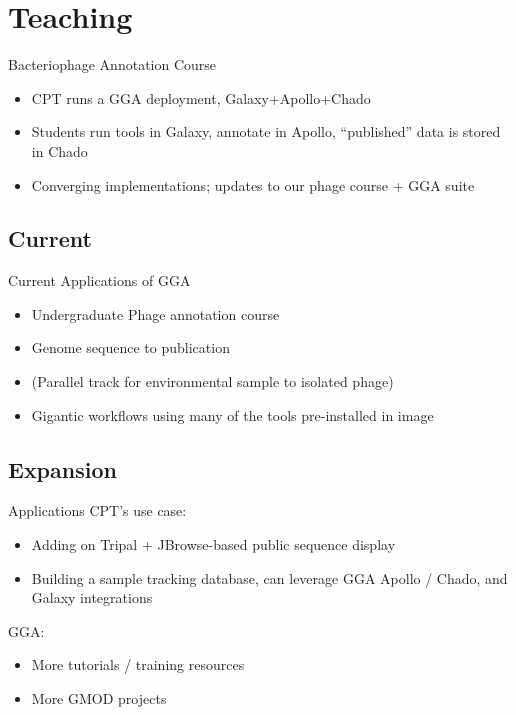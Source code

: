 \documentclass[12pt]{phage3slides} %
\begin{document}
\section{Teaching}
\begin{frame}{Bacteriophage Annotation Course}
    \begin{itemize}
        \item CPT runs a GGA deployment, Galaxy+Apollo+Chado
        \item Students run tools in Galaxy, annotate in Apollo, ``published'' data is stored in Chado
        \item Converging implementations; updates to our phage course + GGA suite
    \end{itemize}
\end{frame}

\subsection{Current}
\begin{frame}{Current Applications of GGA}
    \begin{itemize}
        \item Undergraduate Phage annotation course
        \item Genome sequence to publication
        \item (Parallel track for environmental sample to isolated phage)
        \item Gigantic workflows using many of the tools pre-installed in image
    \end{itemize}
\end{frame}

\subsection{Expansion}
\begin{frame}{Applications}
    CPT's use case:
    \begin{itemize}
        \item Adding on Tripal + JBrowse-based public sequence display
        \item Building a sample tracking database, can leverage GGA Apollo / Chado, and Galaxy integrations
    \end{itemize}
    GGA:
    \begin{itemize}
        \item More tutorials / training resources
        \item More GMOD projects
    \end{itemize}
\end{frame}
\end{document}
